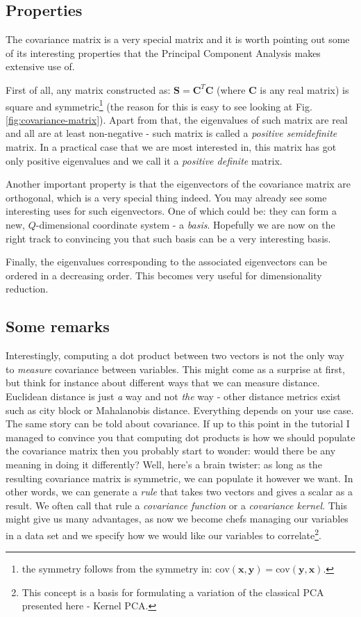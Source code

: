 \documentclass[10pt,twocolumn]{article}
\begin{document}
\subsection{Properties} \label{sec:covariance-properties}

The covariance matrix is a very special matrix and it is worth pointing out some of its interesting properties that the Principal Component Analysis makes extensive use of.

First of all, any matrix constructed as: $\bm{S} = \bm{C}^T \bm{C}$ (where $\bm{C}$ is any real matrix) is square and symmetric\footnote{the symmetry follows from the symmetry in: $\text{cov}(\bm{x},\bm{y}) = \text{cov}(\bm{y},\bm{x})$.} (the reason for this is easy to see looking at Fig.\ref{fig:covariance-matrix}). Apart from that, the eigenvalues of such matrix are real and all are at least non-negative - such matrix is called a \textit{positive semidefinite} matrix. In a practical case that we are most interested in, this matrix has got only positive eigenvalues and we call it a \textit{positive definite} matrix.

Another important property is that the eigenvectors of the covariance matrix are orthogonal, which is a very special thing indeed. You may already see some interesting uses for such eigenvectors. One of which could be: they can form a new, $Q$-dimensional coordinate system - a \textit{basis}. Hopefully we are now on the right track to convincing you that such basis can be a very interesting basis.

Finally, the eigenvalues corresponding to the associated eigenvectors can be ordered in a decreasing order. This becomes very useful for dimensionality reduction.

\subsection{Some remarks}

Interestingly, computing a dot product between two vectors is not the only way to \textit{measure} covariance between variables. This might come as a surprise at first, but think for instance about different ways that we can measure distance. Euclidean distance is just \textit{a} way and not \textit{the} way - other distance metrics exist such as city block or Mahalanobis distance. Everything depends on your use case. The same story can be told about covariance. If up to this point in the tutorial I managed to convince you that computing dot products is how we should populate the covariance matrix then you probably start to wonder: would there be any meaning in doing it differently? Well, here's a brain twister: as long as the resulting covariance matrix is symmetric, we can populate it however we want. In other words, we can generate a \textit{rule} that takes two vectors and gives a scalar as a result. We often call that rule a \textit{covariance function} or a \textit{covariance kernel}. This might give us many advantages, as now we become chefs managing our variables in a data set and we specify how we would like our variables to correlate\footnote{This concept is a basis for formulating a variation of the classical PCA presented here - Kernel PCA.}.
\end{document}
